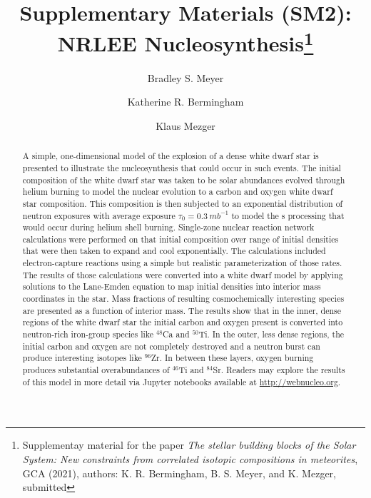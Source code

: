 \documentclass[preprint]{revtex4-2}
\begin{document}
\title{Supplementary Materials (SM2): NRLEE Nucleosynthesis\footnote{Supplementay material for the paper
{\it The stellar building blocks of the Solar System: New constraints from correlated isotopic compositions in meteorites}, GCA (2021), authors: K. R. Bermingham,
B. S. Meyer, and K. Mezger, submitted}}
\author{Bradley S. Meyer}
\author{Katherine R. Bermingham}
\author{Klaus Mezger}

\begin{abstract}
A simple, one-dimensional model of the explosion of a dense white dwarf star
is presented to illustrate the nucleosynthesis that could occur in
such events.
The initial composition of the white dwarf star
was taken to be solar abundances evolved through helium burning to model
the nuclear evolution to a carbon and oxygen white dwarf star composition.
This composition is then
subjected to an exponential distribution of neutron exposures with average
exposure $\tau_0 = 0.3\ mb^{-1}$ to model the s processing that would occur
during helium shell burning.
Single-zone nuclear reaction network calculations
were performed on that initial composition over
range of initial densities that were then taken to expand
and cool exponentially.  The calculations included electron-capture reactions
using a simple but realistic parameterization of those rates.  The results
of those calculations were converted into a white dwarf model by applying
solutions to the Lane-Emden equation to map initial densities into interior
mass coordinates in the star.  Mass fractions of resulting
cosmochemically interesting species are presented as a function of interior
mass.  The results show that in the inner, dense regions of the white dwarf star
the initial carbon and oxygen present is converted into neutron-rich iron-group
species like $^{48}$Ca and $^{50}$Ti.  In the outer, less dense regions,
the initial carbon and oxygen are not completely destroyed and a neutron burst
can produce interesting isotopes like $^{96}$Zr.  In between these layers,
oxygen burning produces substantial overabundances of $^{46}$Ti and $^{84}$Sr.
Readers may explore the results of this model in more detail via Jupyter
notebooks available at \url{http://webnucleo.org}.
\end{abstract}
\end{document}
